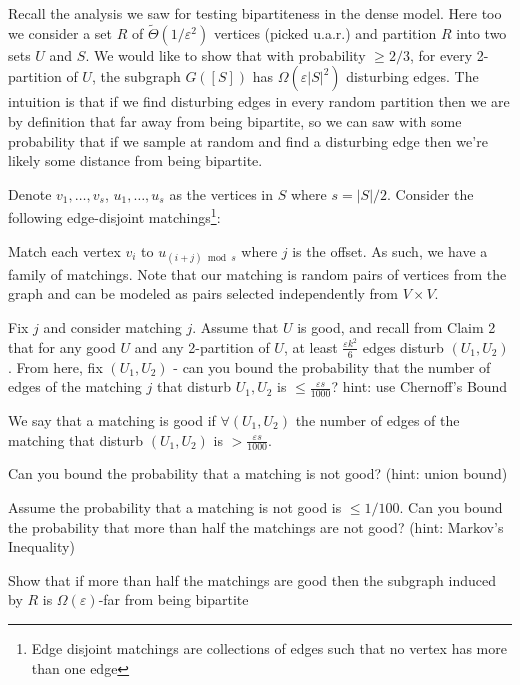 \documentclass{idc_msc}
\begin{document}
Recall the analysis we saw for testing bipartiteness in the dense model.
Here too we consider a set \(R\) of \(\widetilde{\Theta}(1/\varepsilon^2)\) vertices (picked u.a.r.) and partition \(R\) into two sets \(U\) and \(S\).
We would like to show that with probability \(\ge 2/3\), for every 2-partition of \(U\), the subgraph \(G([S])\) has \(\Omega(\varepsilon|S|^2)\) disturbing edges.
The intuition is that if we find disturbing edges in every random partition then we are by definition that far away from being bipartite, so we can saw with some probability that if we sample at random and find a disturbing edge then we're likely some distance from being bipartite.

Denote \(v_1, \ldots, v_s\), \(u_1, \ldots, u_s\) as the vertices in \(S\) where \(s = |S|/2\).
Consider the following edge-disjoint matchings\footnote{Edge disjoint matchings are collections of edges such that no vertex has more than one edge}:

Match each vertex \(v_i\) to \(u_{(i+j) \bmod s}\) where \(j\) is the offset.
As such, we have a family of matchings.
Note that our matching is random pairs of vertices from the graph and can be modeled as pairs selected independently from \(V \times V\).

Fix \(j\) and consider matching \(j\).
Assume that \(U\) is good, and recall from Claim 2 that for any good \(U\) and any 2-partition of \(U\), at least \(\frac{\varepsilon k^2}{6}\) edges disturb \((U_1, U_2)\).
From here, fix \((U_1, U_2)\) - can you bound the probability that the number of edges of the matching \(j\) that disturb \(U_1, U_2\) is \(\le \frac{\varepsilon s}{1000}\)?
hint: use Chernoff's Bound

We say that a matching is good if \(\forall (U_1, U_2)\) the number of edges of the matching that disturb \((U_1, U_2)\) is \(> \frac{\varepsilon s}{1000}\).

Can you bound the probability that a matching is not good? (hint: union bound)

Assume the probability that a matching is not good is \(\le 1/100\).
Can you bound the probability that more than half the matchings are not good? (hint: Markov's Inequality)

Show that if more than half the matchings are good then the subgraph induced by \(R\) is \(\Omega(\varepsilon)\)-far from being bipartite

\end{document}
